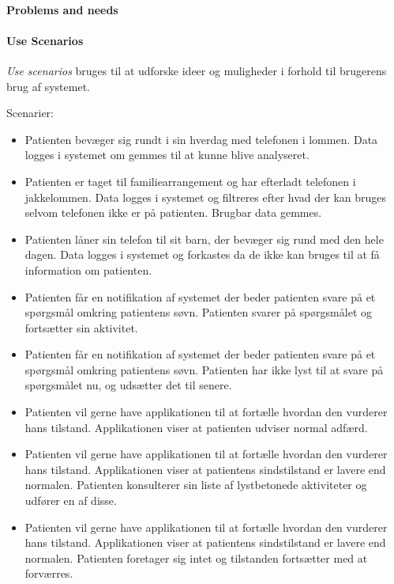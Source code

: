 \paragraph{Problems and needs}

\paragraph{Use Scenarios}
\textit{Use scenarios} bruges til at udforske ideer og muligheder i forhold til brugerens brug af systemet.

Scenarier:
\begin{itemize}
	\item Patienten bevæger sig rundt i sin hverdag med telefonen i lommen. 
	Data logges i systemet om gemmes til at kunne blive analyseret.
	\item Patienten er taget til familiearrangement og har efterladt telefonen i jakkelommen.
	Data logges i systemet og filtreres efter hvad der kan bruges selvom telefonen ikke er på patienten.
	Brugbar data gemmes.
	\item Patienten låner sin telefon til sit barn, der bevæger sig rund med den hele dagen.
	Data logges i systemet og forkastes da de ikke kan bruges til at få information om patienten.
	\item Patienten får en notifikation af systemet der beder patienten svare på et spørgsmål omkring patientens søvn.
	Patienten svarer på spørgsmålet og fortsætter sin aktivitet.
	\item Patienten får en notifikation af systemet der beder patienten svare på et spørgsmål omkring patientens søvn.
	Patienten har ikke lyst til at svare på spørgsmålet nu, og udsætter det til senere.
	\item Patienten vil gerne have applikationen til at fortælle hvordan den vurderer hans tilstand.
	Applikationen viser at patienten udviser normal adfærd.
	\item Patienten vil gerne have applikationen til at fortælle hvordan den vurderer hans tilstand.
	Applikationen viser at patientens sindstilstand er lavere end normalen.
	Patienten konsulterer sin liste af lystbetonede aktiviteter og udfører en af disse.
	\item Patienten vil gerne have applikationen til at fortælle hvordan den vurderer hans tilstand.
	Applikationen viser at patientens sindstilstand er lavere end normalen.
	Patienten foretager sig intet og tilstanden fortsætter med at forværres.
\end{itemize}

